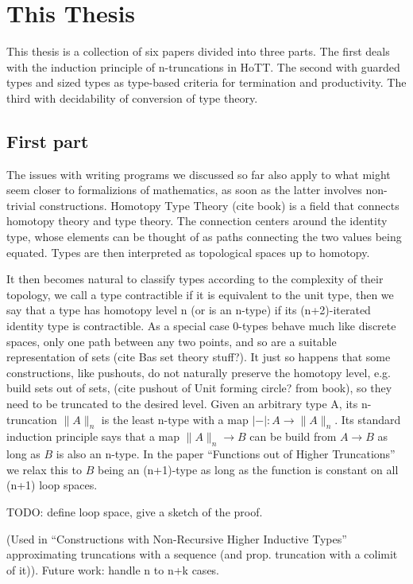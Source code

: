 \documentclass{book}
\newcommand{\tr}[2]{\| #2 \|_{#1}}
\newcommand{\trcon}[1]{| #1 |}
\begin{document}
\section{This Thesis}
  
This thesis is a collection of six papers divided into three parts.
The first deals with the induction principle of n-truncations in HoTT.
The second with guarded types and sized types as type-based criteria
for termination and productivity. The third with decidability of
conversion of type theory.

\subsection{First part}
The issues with writing programs we discussed so far also apply to
what might seem closer to formalizions of mathematics, as soon as the
latter involves non-trivial constructions.
Homotopy Type Theory (cite book) is a field that connects homotopy theory and type theory.
The connection centers around the identity type, whose elements can be
thought of as paths connecting the two values being equated. Types are
then interpreted as topological spaces up to homotopy.

It then becomes natural to classify types according to the complexity
of their topology, we call a type contractible if it is equivalent to
the unit type, then we say that a type has homotopy level n (or is an
n-type) if its (n+2)-iterated identity type is contractible. As a
special case 0-types behave much like discrete spaces, only one path
between any two points, and so are a suitable representation of sets (cite Bas set theory stuff?).
It just so happens that some constructions, like pushouts, do not
naturally preserve the homotopy level, e.g. build sets out of sets, (cite
pushout of Unit forming circle? from book), so they need to be
truncated to the desired level.
Given an arbitrary type A, its n-truncation $\tr{n}{A}$ is the least
n-type with a map $\trcon{-} : A \to \tr{n}{A}$.  Its standard
induction principle says that a map $\tr{n}{A} \to B$ can be build
from $A \to B$ as long as $B$ is also an n-type.
In the paper ``Functions out of Higher Truncations'' we relax this to
$B$ being an (n+1)-type as long as the function is constant on all (n+1) loop spaces.

TODO: define loop space, give a sketch of the proof.

(Used in ``Constructions with Non-Recursive Higher Inductive
Types'' approximating truncations with a sequence (and
prop. truncation with a colimit of it)).
Future work: handle n to n+k cases.
\end{document}
